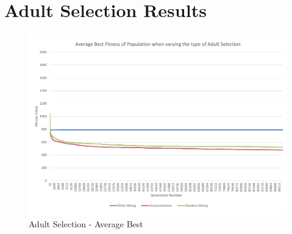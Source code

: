 
\section{Adult Selection Results} %
\label{sec:adult_selection_results}

\begin{landscape}
\begin{figure}[thbp]
	\centerline{\includegraphics[height=0.945\textwidth]{figures/CircleTests/AdultSelection/CircleTestAdultSelectionAverageBest.pdf}}
	\caption{Adult Selection - Average Best}
	\label{fig:ctasab}
\end{figure}
\end{landscape}

